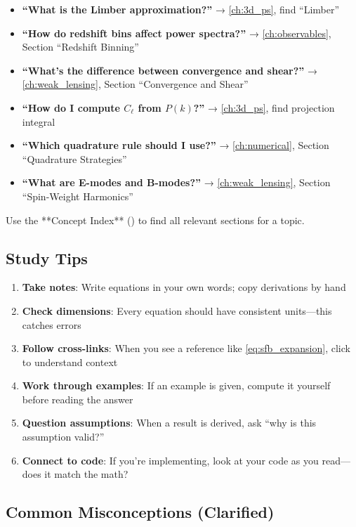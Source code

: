 \begin{itemize}
    \item \textbf{``What is the Limber approximation?''} → \cref{ch:3d_ps}, find ``Limber''
    \item \textbf{``How do redshift bins affect power spectra?''} → \cref{ch:observables}, Section ``Redshift Binning''
    \item \textbf{``What's the difference between convergence and shear?''} → \cref{ch:weak_lensing}, Section ``Convergence and Shear''
    \item \textbf{``How do I compute $C_\ell$ from $P(k)$?''} → \cref{ch:3d_ps}, find projection integral
    \item \textbf{``Which quadrature rule should I use?''} → \cref{ch:numerical}, Section ``Quadrature Strategies''
    \item \textbf{``What are E-modes and B-modes?''} → \cref{ch:weak_lensing}, Section ``Spin-Weight Harmonics''
\end{itemize}

Use the **Concept Index** () to find all relevant sections for a topic.

\subsection{Study Tips}\label{subsec:guide_tips}

\begin{enumerate}
    \item \textbf{Take notes}: Write equations in your own words; copy derivations by hand
    \item \textbf{Check dimensions}: Every equation should have consistent units—this catches errors
    \item \textbf{Follow cross-links}: When you see a reference like \cref{eq:sfb_expansion}, click to understand context
    \item \textbf{Work through examples}: If an example is given, compute it yourself before reading the answer
    \item \textbf{Question assumptions}: When a result is derived, ask ``why is this assumption valid?''
    \item \textbf{Connect to code}: If you're implementing, look at your code as you read—does it match the math?
\end{enumerate}

\subsection{Common Misconceptions (Clarified)}\label{subsec:guide_misconceptions}

